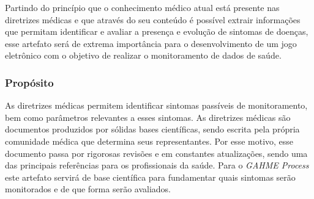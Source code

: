 Partindo do princípio que o conhecimento médico atual está presente nas diretrizes médicas e que através do seu conteúdo é possível 	extrair informações que permitam identificar e avaliar a presença e evolução de sintomas de doenças, esse artefato será de extrema importância para o desenvolvimento de um jogo eletrônico com o objetivo de realizar o monitoramento de dados de saúde.
\subsubsection{Propósito}
As diretrizes médicas permitem identificar sintomas passíveis de monitoramento, bem como parâmetros  relevantes a esses sintomas. As diretrizes médicas são documentos produzidos por sólidas bases científicas, sendo escrita pela própria comunidade médica que determina seus representantes. Por esse motivo, esse documento passa por rigorosas revisões e em constantes atualizações, sendo uma das principais referências para os profissionais da saúde. Para o \textit{GAHME Process} este artefato servirá de base científica para fundamentar quais sintomas serão monitorados e de que forma serão avaliados.



